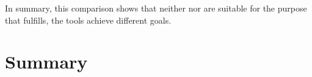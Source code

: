 In summary, this comparison shows that neither \toolVet{} nor \toolGosec{} are suitable for the purpose that
\toolSafer{} fulfills, the tools achieve different goals.



\section{Summary}\label{sec:go-safer:summary}

